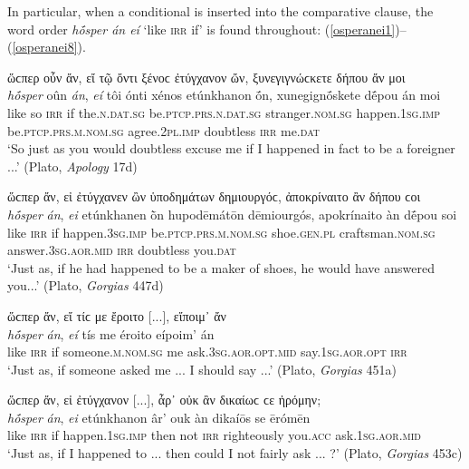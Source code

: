 In particular, when a conditional is inserted into the comparative clause, the word order \emph{hṓsper án eí} `like \textsc{irr} if' is found throughout: (\ref{osperanei1})--(\ref{osperanei8}).

\begin{exe}
\ex ὥϲπερ οὖν ἄν, εἴ τῷ ὄντι ξένοϲ ἐτύγχανον ὤν, ξυνεγιγνώϲκετε δήπου ἄν μοι\\
\gll \emph{hṓsper} oûn \emph{án}, \emph{eí} tôi ónti xénos etúnkhanon ṓn, xunegignṓskete dḗpou án moi\\
like so \textsc{irr} if the.\textsc{n.dat.sg} be.\textsc{ptcp.prs.n.dat.sg} stranger.\textsc{nom.sg} happen.\textsc{1sg.imp} be.\textsc{ptcp.prs.m.nom.sg}
agree.\textsc{2pl.imp} doubtless \textsc{irr} me.\textsc{dat}\\
\trans `So just as you would doubtless excuse me if I happened in fact to be a foreigner ...' (Plato, \textit{Apology} 17d)
\label{osperanei1}
\end{exe}

\begin{exe}
\ex ὥϲπερ ἄν, εἰ ἐτύγχανεν ὢν ὑποδημάτων δημιουργόϲ, ἀποκρίναιτο ἂν δήπου ϲοι\\
\gll \emph{hṓsper} \emph{án}, \emph{ei} etúnkhanen ṑn hupodēmátōn dēmiourgós, apokrínaito àn dḗpou soi\\
like \textsc{irr} if happen.\textsc{3sg.imp} be.\textsc{ptcp.prs.m.nom.sg} shoe.\textsc{gen.pl} craftsman.\textsc{nom.sg} answer.\textsc{3sg.aor.mid} \textsc{irr} doubtless you.\textsc{dat}\\
\trans `Just as, if he had happened to be a maker of shoes, he would have answered you...' (Plato, \textit{Gorgias} 447d)
\label{osperanei2}
\end{exe}

\begin{exe}
\ex ὥϲπερ ἄν, εἴ τίϲ με ἔροιτο {[}...{]}, εἴποιμ᾽ ἄν\\
\gll \emph{hṓsper} \emph{án}, \emph{eí} tís me éroito eípoim' án\\
like \textsc{irr} if someone.\textsc{m.nom.sg} me ask.\textsc{3sg.aor.opt.mid} say.\textsc{1sg.aor.opt} \textsc{irr}\\
\trans `Just as, if someone asked me ... I should say ...' (Plato, \textit{Gorgias} 451a)
\label{osperanei3}
\end{exe}

\begin{exe}
\ex ὥϲπερ ἄν, εἰ ἐτύγχανον {[}...{]}, ἆρ᾽ οὐκ ἂν δικαίωϲ ϲε ἠρόμην;\\
\gll \emph{hṓsper} \emph{án}, \emph{ei} etúnkhanon âr' ouk àn dikaíōs se ērómēn\\
like \textsc{irr} if happen.\textsc{1sg.imp} then not \textsc{irr}
righteously you.\textsc{acc} ask.\textsc{1sg.aor.mid}\\
\trans `Just as, if I happened to ... then could I not fairly
ask ... ?' (Plato, \textit{Gorgias} 453c)
\label{osperanei4}
\end{exe}

